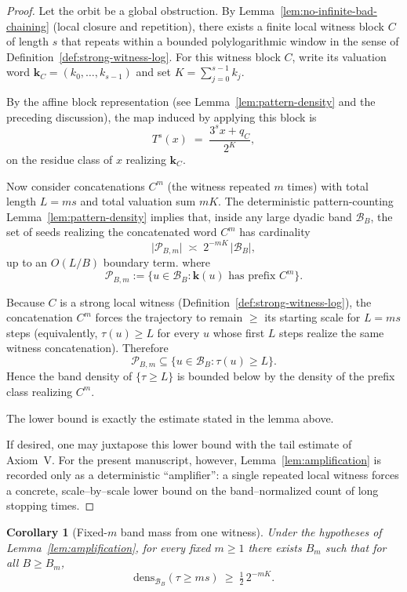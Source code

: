 \documentclass[preprint,12pt]{elsarticle}
\newtheorem{corollary}{Corollary}
\newcommand{\densB}[2]{\mathrm{dens}_{#1}\!\left(#2\right)}
\begin{document}
\begin{proof}
Let the orbit be a global obstruction. By Lemma~\ref{lem:no-infinite-bad-chaining}
(local closure and repetition), there exists a finite local witness block $C$
of length $s$ that repeats within a bounded polylogarithmic window in the sense of
Definition~\ref{def:strong-witness-log}. For this witness block $C$, write its valuation word
$\mathbf{k}_C=(k_0,\dots,k_{s-1})$ and set $K=\sum_{j=0}^{s-1}k_j$.

By the affine block representation (see Lemma~\ref{lem:pattern-density} and the
preceding discussion), the map induced by applying this block is
\[
T^s(x) \;=\; \frac{3^s x + q_C}{2^K},
\]
on the residue class of $x$ realizing $\mathbf{k}_C$.

Now consider concatenations $C^m$ (the witness repeated $m$ times) with total
length $L=ms$ and total valuation sum $mK$. The deterministic pattern-counting
Lemma~\ref{lem:pattern-density} implies that, inside any large dyadic band
$\mathcal{B}_B$, the set of seeds realizing the concatenated word $C^m$ has
cardinality
\[
\big|\mathcal P_{B,m}\big|
\;\asymp\; 2^{-mK}\,|\mathcal{B}_B|,
\]
up to an $O(L/B)$ boundary term.
where
\[
\mathcal P_{B,m}:=\{u\in\mathcal{B}_B:\mathbf{k}(u)\text{ has prefix }C^m\}.
\]

Because $C$ is a strong local witness (Definition~\ref{def:strong-witness-log}), the
concatenation $C^m$ forces the trajectory to remain $\ge$ its starting scale
for $L=ms$ steps (equivalently, $\tau(u)\ge L$ for every $u$ whose first $L$
steps realize the same witness concatenation). Therefore
\[
\mathcal P_{B,m}\subseteq\{u\in\mathcal{B}_B:\tau(u)\ge L\}.
\]
Hence the band density of $\{\tau\ge L\}$ is bounded below by the density of
the prefix class realizing $C^m$.

The lower bound is exactly the estimate stated in the lemma above.

If desired, one may juxtapose this lower bound with the tail estimate of Axiom~V.
For the present manuscript, however, Lemma~\ref{lem:amplification} is recorded only as a deterministic
``amplifier'': a single repeated local witness forces a concrete, scale--by--scale lower bound on the
band--normalized count of long stopping times.

\end{proof}

\begin{corollary}[Fixed-$m$ band mass from one witness]
\label{cor:fixedm-bandmass}
Under the hypotheses of Lemma~\ref{lem:amplification}, for every \emph{fixed} $m\ge 1$ there exists $B_m$ such that for all $B\ge B_m$,
\[\densB{\mathcal{B}_B}{\tau\ge ms}\ \ge\ \tfrac12\,2^{-mK}.\]
\end{corollary}
\end{document}
